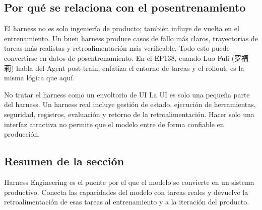 \subsection{Por qué se relaciona con el posentrenamiento}

El harness no es solo ingeniería de producto; también influye de vuelta en el entrenamiento. Un buen harness produce casos de fallo más claros, trayectorias de tareas más realistas y retroalimentación más verificable. Todo esto puede convertirse en datos de posentrenamiento. En el EP138, cuando Luo Fuli (罗福莉) habla del Agent post-train, enfatiza el entorno de tareas y el rollout; es la misma lógica que aquí.

\begin{warningbox}{No tratar el harness como un envoltorio de UI}
La UI es solo una pequeña parte del harness. Un harness real incluye gestión de estado, ejecución de herramientas, seguridad, registros, evaluación y retorno de la retroalimentación. Hacer solo una interfaz atractiva no permite que el modelo entre de forma confiable en producción.
\end{warningbox}

\subsection{Resumen de la sección}

Harness Engineering es el puente por el que el modelo se convierte en un sistema productivo. Conecta las capacidades del modelo con tareas reales y devuelve la retroalimentación de esas tareas al entrenamiento y a la iteración del producto.

